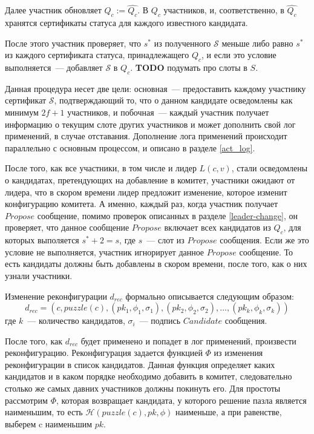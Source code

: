 Далее участник обновляет $Q_c :=\hat{Q_c}$.
В $Q_c$ участников, и, соответственно, в $\hat{Q_c}$ хранятся сертификаты статуса для каждого известного кандидата.

После этого участник проверяет, что $s^{*}$ из полученного $\mathcal{S}$ меньше либо равно $s^{*}$ из каждого сертификата статуса, принадлежащего $Q_c$, и если это условие выполняется~--- добавляет $\mathcal{S}$ в $Q_c$. \textbf{TODO} подумать про слоты в $S$.

Данная процедура несет две цели: основная~--- предоставить каждому участнику сертификат $\mathcal{S}$, подтверждающий то, что о данном кандидате осведомлены как минимум $2f+1$ участников, и побочная~--- каждый участник получает информацию о текущим слоте других участников и может дополнить свой лог применений, в случае отставания. Дополнение лога применений происходит параллельно с основным процессом, и описано в разделе \ref{act_log}.

После того, как все участники, в том числе и лидер $L(c, v)$, стали осведомлены о кандидатах, претендующих на добавление в комитет, участники ожидают от лидера, что в скором времени лидер предложит изменение, которое изменит конфигурацию комитета. А именно, каждый раз, когда участник получает $Propose$ сообщение, помимо проверок описанных в  разделе \ref{leader-change}, он проверяет, что данное сообщение $Propose$ включает всех кандидатов из $Q_c$, для которых выполяется $s^{*} + 2 = s$, где $s$~--- слот из $Propose$ сообщения. Если же это условие не выполняется, участник игнорирует данное $Propose$ сообщение. То есть кандидаты должны быть добавлены в скором времени, после того, как о них узнали участники. 

Изменение реконфигурации $d_{rec}$ формально описывается следующим образом:
$$d_{rec}=(c, puzzle(c), (pk_1, \phi_1, \sigma_1), (pk_2, \phi_2, \sigma_2),...,(pk_k, \phi_k, \sigma_k))$$
где $k$~--- количество кандидатов, $\sigma_i$~--- подпись $Candidate$ сообщения.

После того, как $d_{rec}$ будет применено и попадет в лог применений, произвести реконфигурацию.
Реконфигурация задается функцией $\Phi$ из изменения реконфигурации в список кандидатов. Данная функция определяет каких кандидатов и в каком порядке необходимо добавить в комитет, следовательно столько же самых давних участников должны покинуть его. Для простоты рассмотрим $\Phi$, которая возвращает кандидата, у которого решение пазла является наименьшим, то есть $\mathcal{H}(puzzle(c), pk, \phi)$ наименьше, а при равенстве, выберем c наименьшим $pk$.

